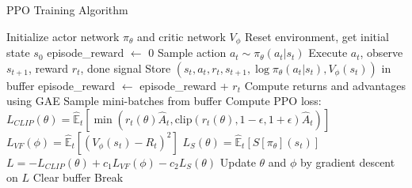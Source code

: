\documentclass[12pt]{article}
\begin{document}

\begin{algorithm}[h]
\caption{PPO Training Algorithm}
\begin{algorithmic}[1]
\State Initialize actor network $\pi_\theta$ and critic network $V_\phi$
    \State Reset environment, get initial state $s_0$
    \State episode\_reward $\gets$ 0
        \State Sample action $a_t \sim \pi_\theta(a_t|s_t)$
        \State Execute $a_t$, observe $s_{t+1}$, reward $r_t$, done signal
        \State Store $(s_t, a_t, r_t, s_{t+1}, \log\pi_\theta(a_t|s_t), V_\phi(s_t))$ in buffer
        \State episode\_reward $\gets$ episode\_reward + $r_t$
            \State Compute returns and advantages using GAE
                \State Sample mini-batches from buffer
                \State Compute PPO loss:
                \State $L_{CLIP}(\theta) = \hat{\mathbb{E}}_t[\min(r_t(\theta)\hat{A}_t, \text{clip}(r_t(\theta), 1-\epsilon, 1+\epsilon)\hat{A}_t)]$
                \State $L_{VF}(\phi) = \hat{\mathbb{E}}_t[(V_\phi(s_t) - R_t)^2]$
                \State $L_{S}(\theta) = \hat{\mathbb{E}}_t[S[\pi_\theta](s_t)]$
                \State $L = -L_{CLIP}(\theta) + c_1 L_{VF}(\phi) - c_2 L_{S}(\theta)$
                \State Update $\theta$ and $\phi$ by gradient descent on $L$
            \EndFor
            \State Clear buffer
        \EndIf
            \State Break
        \EndIf
    \EndFor
\EndFor
\end{algorithmic}
\end{algorithm}
\end{document}
